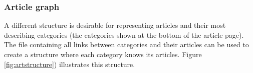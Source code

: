 \subsubsection{Article graph}
A different structure is desirable for representing articles and their most describing categories (the categories shown at the bottom of the article page). The file containing all links between categories and their articles can be used to create a structure where each category knows its articles. Figure \ref{fig:artstructure}) illustrates this structure. 

